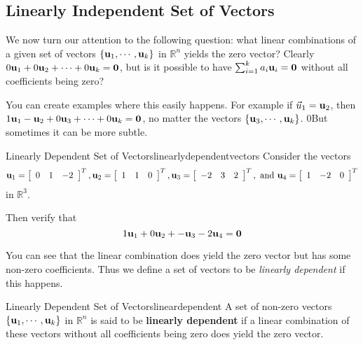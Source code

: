 \subsection{Linearly Independent Set of Vectors}

We now turn our attention to the following question: what linear
combinations of a given set of vectors $\{ {\bf u}_1, \cdots
,{\bf u}_k\}$ in $\mathbb{R}^{n}$ yields the zero vector? Clearly
$0{\bf u}_1 + 0{\bf u}_2+ \cdots + 0 {\bf u}_k = {\bf 0}$, but is
it possible to have $\sum_{i=1}^{k}a_{i}{\bf u}_{i}={\bf 0}$ without
all coefficients being zero?

You can create examples where this easily happens. For example if $\vec{u}_1={\bf u}_2$, then 
$1{\bf u}_1 - {\bf u}_2+ 0 {\bf u}_3 + \cdots  + 0 {\bf u}_k = {\bf 0}$, no matter the vectors 
 $\{ {\bf u}_3, \cdots ,{\bf u}_k\}$. 0But sometimes it can be more subtle. 

\begin{example}{Linearly Dependent Set of Vectors}{linearlydependentvectors}
Consider the vectors 
\begin{equation*}
{\bf u}_1=\left[ 
\begin{array}{rrr}
0  & 1 & -2
\end{array}
\right]^T, 
{\bf u}_2=\left[ 
\begin{array}{rrr}
1  & 1 & 0
\end{array}
\right]^T, 
{\bf u}_3=\left[ 
\begin{array}{rrr}
-2  & 3 & 2
\end{array}
\right]^T, \mbox{ and } 
{\bf u}_4=\left[ 
\begin{array}{rrr}
1  & -2 & 0
\end{array}
\right]^T
\end{equation*}
in $\mathbb{R}^{3}$.

Then verify that 
\begin{equation*}
1{\bf u}_1 +0 {\bf u}_2+ - {\bf u}_3 -2 {\bf u}_4 = {\bf 0}
\end{equation*}
\end{example}

You can see that the linear combination does yield the zero vector but
has some non-zero coefficients. Thus we define a set of vectors to be
{\em linearly dependent} if this happens.

\begin{definition}{Linearly Dependent Set of Vectors}{lineardependent}
A set of non-zero vectors $\{ {\bf u}_1, \cdots ,{\bf u}_k\}$ in $\mathbb{R}^{n}$ is said to be 
\textbf{linearly dependent} if a linear combination of these vectors without all  coefficients being zero does yield the zero vector.
\end{definition}

